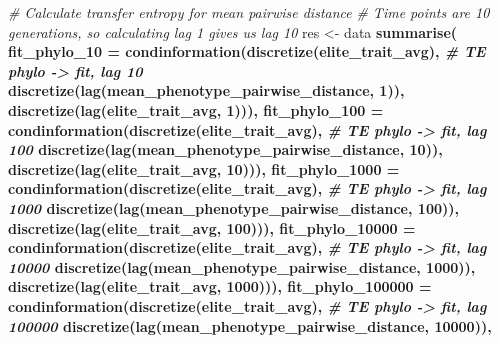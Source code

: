 \documentclass[]{book}
\newenvironment{Shaded}{\begin{snugshade}}{\end{snugshade}}
\newcommand{\CommentTok}[1]{\textcolor[rgb]{0.56,0.35,0.01}{\textit{#1}}}
\newcommand{\DataTypeTok}[1]{\textcolor[rgb]{0.13,0.29,0.53}{#1}}
\newcommand{\DecValTok}[1]{\textcolor[rgb]{0.00,0.00,0.81}{#1}}
\newcommand{\KeywordTok}[1]{\textcolor[rgb]{0.13,0.29,0.53}{\textbf{#1}}}
\newcommand{\NormalTok}[1]{#1}
\newcommand{\OperatorTok}[1]{\textcolor[rgb]{0.81,0.36,0.00}{\textbf{#1}}}
\newcommand{\StringTok}[1]{\textcolor[rgb]{0.31,0.60,0.02}{#1}}
\begin{document}
\begin{Shaded}
\begin{Highlighting}[]
\CommentTok{# Calculate transfer entropy for mean pairwise distance}
\CommentTok{# Time points are 10 generations, so calculating lag 1 gives us lag 10}
\NormalTok{res <-}\StringTok{ }\NormalTok{data }\OperatorTok{%
\KeywordTok{summarise}\NormalTok{(}
  \DataTypeTok{fit_phylo_10 =}     \KeywordTok{condinformation}\NormalTok{(}\KeywordTok{discretize}\NormalTok{(elite_trait_avg), }\CommentTok{# TE phylo -> fit, lag 10}
                                     \KeywordTok{discretize}\NormalTok{(}\KeywordTok{lag}\NormalTok{(mean_phenotype_pairwise_distance, }\DecValTok{1}\NormalTok{)), }
                                     \KeywordTok{discretize}\NormalTok{(}\KeywordTok{lag}\NormalTok{(elite_trait_avg, }\DecValTok{1}\NormalTok{))),}
  \DataTypeTok{fit_phylo_100 =}    \KeywordTok{condinformation}\NormalTok{(}\KeywordTok{discretize}\NormalTok{(elite_trait_avg), }\CommentTok{# TE phylo -> fit, lag 100}
                                     \KeywordTok{discretize}\NormalTok{(}\KeywordTok{lag}\NormalTok{(mean_phenotype_pairwise_distance, }\DecValTok{10}\NormalTok{)), }
                                     \KeywordTok{discretize}\NormalTok{(}\KeywordTok{lag}\NormalTok{(elite_trait_avg, }\DecValTok{10}\NormalTok{))),}
  \DataTypeTok{fit_phylo_1000 =}   \KeywordTok{condinformation}\NormalTok{(}\KeywordTok{discretize}\NormalTok{(elite_trait_avg), }\CommentTok{# TE phylo -> fit, lag 1000}
                                     \KeywordTok{discretize}\NormalTok{(}\KeywordTok{lag}\NormalTok{(mean_phenotype_pairwise_distance, }\DecValTok{100}\NormalTok{)), }
                                     \KeywordTok{discretize}\NormalTok{(}\KeywordTok{lag}\NormalTok{(elite_trait_avg, }\DecValTok{100}\NormalTok{))),}
  \DataTypeTok{fit_phylo_10000 =}  \KeywordTok{condinformation}\NormalTok{(}\KeywordTok{discretize}\NormalTok{(elite_trait_avg), }\CommentTok{# TE phylo -> fit, lag 10000}
                                     \KeywordTok{discretize}\NormalTok{(}\KeywordTok{lag}\NormalTok{(mean_phenotype_pairwise_distance, }\DecValTok{1000}\NormalTok{)), }
                                     \KeywordTok{discretize}\NormalTok{(}\KeywordTok{lag}\NormalTok{(elite_trait_avg, }\DecValTok{1000}\NormalTok{))),}
  \DataTypeTok{fit_phylo_100000 =} \KeywordTok{condinformation}\NormalTok{(}\KeywordTok{discretize}\NormalTok{(elite_trait_avg), }\CommentTok{# TE phylo -> fit, lag 100000}
                                     \KeywordTok{discretize}\NormalTok{(}\KeywordTok{lag}\NormalTok{(mean_phenotype_pairwise_distance, }\DecValTok{10000}\NormalTok{)), }
}
\end{Highlighting}
\end{Shaded}
\end{document}
